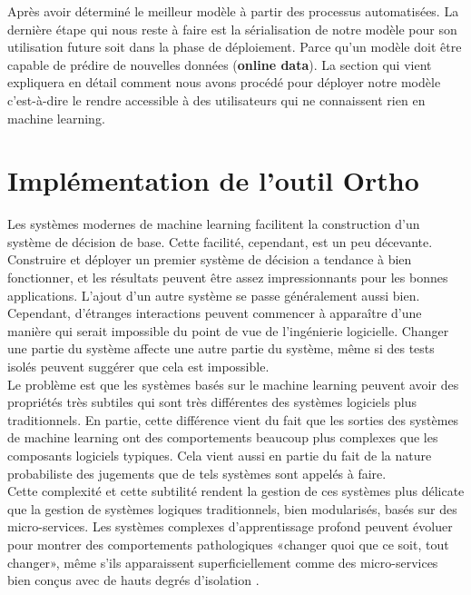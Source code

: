 \documentclass[12pt, french]{report}
\begin{document}
Après avoir déterminé le meilleur modèle à partir des processus automatisées. La dernière étape qui nous reste à faire est la sérialisation de notre modèle pour son utilisation future soit dans la phase de déploiement. Parce qu'un modèle doit être capable de prédire de nouvelles données (\textbf{online data}). La section qui vient expliquera en détail comment nous avons procédé pour déployer notre modèle c'est-à-dire le rendre accessible à des utilisateurs qui ne connaissent rien en machine learning.  \\ 



 

\chapter{Implémentation de l'outil Ortho} \label{chap:ortho}

Les systèmes modernes de machine learning facilitent la construction d'un système de décision de base. Cette facilité, cependant, est un peu décevante. Construire et déployer un premier système de décision a tendance à bien fonctionner, et les résultats peuvent être assez impressionnants pour les bonnes applications. L'ajout d'un autre système se passe généralement aussi bien. Cependant, d'étranges interactions peuvent commencer à apparaître d'une manière qui serait impossible du point de vue de l'ingénierie logicielle. Changer une partie du système affecte une autre partie du système, même si des tests isolés peuvent suggérer que cela est impossible. \\

Le problème est que les systèmes basés sur le machine learning peuvent avoir des propriétés très subtiles qui sont très différentes des systèmes logiciels plus traditionnels. En partie, cette différence vient du fait que les sorties des systèmes de machine learning ont des comportements beaucoup plus complexes que les composants logiciels typiques. Cela vient aussi en partie du fait de la nature probabiliste des jugements que de tels systèmes sont appelés à faire. \\

Cette complexité et cette subtilité rendent la gestion de ces systèmes plus délicate que la gestion de systèmes logiques traditionnels, bien modularisés, basés sur des micro-services. Les systèmes complexes d'apprentissage profond peuvent évoluer pour montrer des comportements pathologiques «changer quoi que ce soit, tout changer», même s'ils apparaissent superficiellement comme des micro-services bien conçus avec de hauts degrés d'isolation \cite{key7}.\\
\end{document}
